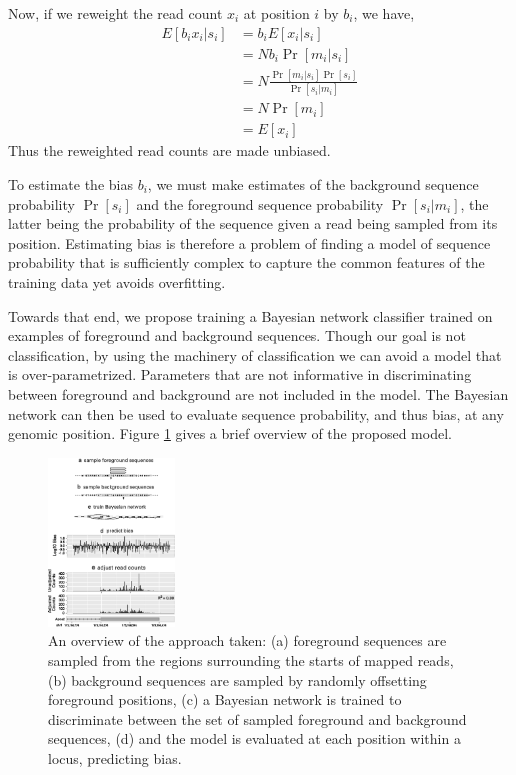 \documentclass{bioinfo}
\begin{document}
Now, if we reweight the read count $x_i$ at position $i$ by $b_i$, we
have,
\begin{align*}
E[ b_i x_i | s_i ] &= b_i E[ x_i | s_i ] \\
&= N b_i \Pr[ m_i | s_i ] \\
&= N \frac{ \Pr[ m_i | s_i ] \Pr[ s_i ] }{ \Pr[ s_i | m_i ] } \\
&= N \Pr[ m_i ] \\
&= E[ x_i ]
\end{align*}
Thus the reweighted read counts are made unbiased.

To estimate the bias $b_i$, we must make estimates of the background sequence
probability $\Pr[s_i]$ and the foreground sequence probability $\Pr[ s_i | m_i
]$, the latter being the probability of the sequence given a read being sampled
from its position. Estimating bias is therefore a problem of finding a model of
sequence probability that is sufficiently complex to capture the common features
of the training data yet avoids overfitting.

Towards that end, we propose training a Bayesian network classifier trained on
examples of foreground and background sequences. Though our goal is not
classification, by using the machinery of classification we can avoid a model
that is over-parametrized. Parameters that are not informative in
discriminating between foreground and background are not included in the model.
The Bayesian network can then be used to evaluate sequence probability, and thus
bias, at any genomic position. Figure \ref{fig:overview} gives a brief overview
of the proposed model.

\begin{figure}
\centerline{\includegraphics[width=0.30\textwidth]{overview.eps}}
\caption{An overview of the approach taken: (a) foreground sequences are sampled
from the regions surrounding the starts of mapped reads, (b) background
sequences are sampled by randomly offsetting foreground positions, (c) a
Bayesian network is trained to discriminate between the set of
sampled foreground and background sequences, (d) and the model is evaluated
at each position within a locus, predicting bias.}
\label{fig:overview}
\end{figure}
\end{document}

